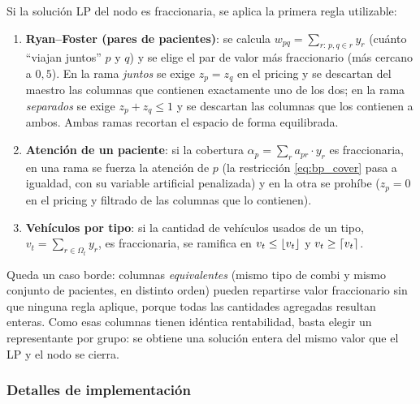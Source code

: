 \documentclass[12pt]{article}
\numberwithin{algorithm}{section}
\DeclarePairedDelimiter\floor{\lfloor}{\rfloor}
\DeclarePairedDelimiter\ceil{\lceil}{\rceil}
\begin{document}
Si la solución LP del nodo es fraccionaria, se aplica la primera regla utilizable:

\begin{enumerate}
    \item \textbf{Ryan--Foster (pares de pacientes)}: se calcula $w_{pq} = \sum_{r:\, p,q \in r} y_r$ (cuánto ``viajan juntos'' $p$ y $q$) y se elige el par de valor más fraccionario (más cercano a $0{,}5$). En la rama \emph{juntos} se exige $z_p = z_q$ en el pricing y se descartan del maestro las columnas que contienen exactamente uno de los dos; en la rama \emph{separados} se exige $z_p + z_q \leq 1$ y se descartan las columnas que los contienen a ambos. Ambas ramas recortan el espacio de forma equilibrada.
    \item \textbf{Atención de un paciente}: si la cobertura $\alpha_p = \sum_{r} a_{pr} \cdot y_r$ es fraccionaria, en una rama se fuerza la atención de $p$ (la restricción \eqref{eq:bp_cover} pasa a igualdad, con su variable artificial penalizada) y en la otra se prohíbe ($z_p = 0$ en el pricing y filtrado de las columnas que lo contienen).
    \item \textbf{Vehículos por tipo}: si la cantidad de vehículos usados de un tipo, $v_t = \sum_{r \in \Omega_t} y_r$, es fraccionaria, se ramifica en $v_t \leq \floor{v_t}$ y $v_t \geq \ceil{v_t}$.
\end{enumerate}

Queda un caso borde: columnas \emph{equivalentes} (mismo tipo de combi y mismo conjunto de pacientes, en distinto orden) pueden repartirse valor fraccionario sin que ninguna regla aplique, porque todas las cantidades agregadas resultan enteras. Como esas columnas tienen idéntica rentabilidad, basta elegir un representante por grupo: se obtiene una solución entera del mismo valor que el LP y el nodo se cierra.

\subsubsection{Detalles de implementación}
\label{sec:challenger_impl}
\end{document}
